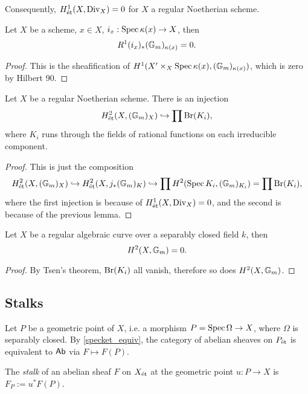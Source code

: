 \documentclass[11pt]{amsart}
\begin{document}
Consequently, $H^1_{\operatorname{\acute{e}t}}(X, \operatorname{Div}_X) = 0$ for $X$ a regular Noetherian scheme.

\begin{lem}
    Let $X$ be a scheme, $x\in X$, $i_x: \operatorname{Spec} \kappa(x) \to X$, then
    \[R^1(i_x)_\ast(\mathbb{G}_m)_{\kappa(x)} = 0.\]
\end{lem}

\begin{proof}
    This is the sheafification of $H^1(X'\times_X \operatorname{Spec} \kappa(x), (\mathbb{G}_m)_{\kappa(x)})$, which is zero by Hilbert 90.
\end{proof}

\begin{cor}
    Let $X$ be a regular Noetherian scheme. There is an injection
    \[H^2_{\operatorname{\acute{e}t}}(X, (\mathbb{G}_m)_X)\hookrightarrow \prod \operatorname{Br}(K_i),\]
    where $K_i$ runs through the fields of rational functions on each irreducible component.
\end{cor}

\begin{proof}
    This is just the composition
    \[H^2_{\operatorname{\acute{e}t}}(X,(\mathbb{G}_m)_X) \hookrightarrow H^2_{\operatorname{\acute{e}t}}(X, j_\ast(\mathbb{G}_m)_K) \hookrightarrow \prod H^2(\operatorname{Spec} K_i, (\mathbb{G}_m)_{K_i}) = \prod \operatorname{Br}(K_i),\]
    where the first injection is because of $H^1_{\operatorname{\acute{e}t}}(X,\operatorname{Div}_X) = 0$, and the second is because of the previous lemma.
\end{proof}

\begin{cor}
    Let $X$ be a regular algebraic curve over a separably closed field $k$, then 
    \[H^2(X, \mathbb{G}_m) = 0.\]
\end{cor}

\begin{proof}
    By Tsen's theorem, $\operatorname{Br}(K_i)$ all vanish, therefore so does $H^2(X, \mathbb{G}_m)$.
\end{proof}

\subsection{Stalks}
\label{stalks}

Let $P$ be a geometric point of $X$, i.e. a morphism $P = \operatorname{Spec}\Omega\to X$, where $\Omega$ is separably closed. By \ref{specket_equiv}, the category of abelian sheaves on $P_{\operatorname{\acute{e}t}}$ is equivalent to $\mathsf{Ab}$ via $F\mapsto F(P)$.

\begin{defn}
    The \emph{stalk} of an abelian sheaf $F$ on $X_{\operatorname{\acute{e}t}}$ at the geometric point $u:P\to X$ is $F_P := u^\ast F(P)$.
\end{defn}
\end{document}
